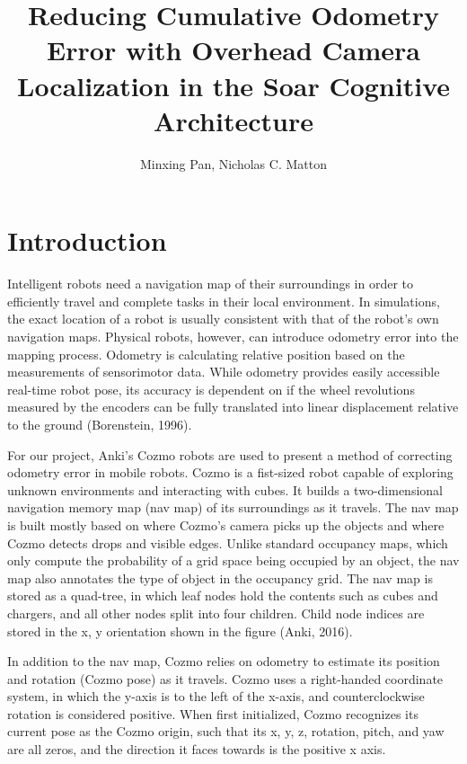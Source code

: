 \documentclass[man]{apa6}
\title{Reducing Cumulative Odometry Error with Overhead Camera Localization in the Soar Cognitive Architecture}
\author{Minxing Pan, Nicholas C. Matton}
\affiliation{The University of Michigan}
\begin{document}
\maketitle

\section{Introduction}
Intelligent robots need a navigation map of their surroundings in order to efficiently travel and complete tasks in their local environment. In simulations, the exact location of a robot is usually consistent with that of the robot’s own navigation maps. Physical robots, however, can introduce odometry error into the mapping process. Odometry is calculating relative position based on the measurements of sensorimotor data. While odometry provides easily accessible real-time robot pose, its accuracy is dependent on if the wheel revolutions measured by the encoders can be fully translated into linear displacement relative to the ground (Borenstein, 1996).

For our project, Anki’s Cozmo robots are used to present a method of correcting odometry error in mobile robots. Cozmo is a fist-sized robot capable of exploring unknown environments and interacting with cubes. It builds a two-dimensional navigation memory map (nav map) of its surroundings as it travels. The nav map is built mostly based on where Cozmo’s camera picks up the objects and where Cozmo detects drops and visible edges. Unlike standard occupancy maps, which only compute the probability of a grid space being occupied by an object, the nav map also annotates the type of object in the occupancy grid. The nav map is stored as a quad-tree, in which leaf nodes hold the contents such as cubes and chargers, and all other nodes split into four children. Child node indices are stored in the x, y orientation shown in the figure (Anki, 2016).

In addition to the nav map, Cozmo relies on odometry to estimate its position and rotation (Cozmo pose) as it travels. Cozmo uses a right-handed coordinate system, in which the y-axis is to the left of the x-axis, and counterclockwise rotation is considered positive. When first initialized, Cozmo recognizes its current pose as the Cozmo origin, such that its x, y, z, rotation, pitch, and yaw are all zeros, and the direction it faces towards is the positive x axis. 
\end{document}
